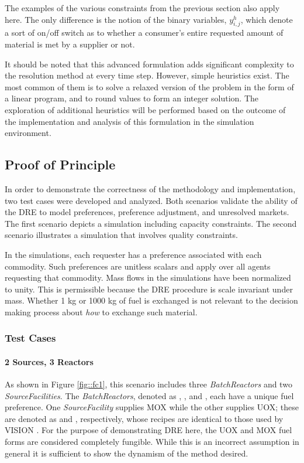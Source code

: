 The examples of the various constraints from the previous section also apply
here. The only difference is the notion of the binary variables, $y_{i,j}^{h}$,
which denote a sort of on/off switch as to whether a consumer's entire requested
amount of material is met by a supplier or not.

It should be noted that this advanced formulation adds significant complexity to
the resolution method at every time step. However, simple heuristics exist. The
most common of them is to solve a relaxed version of the problem in the form of
a linear program, and to round values to form an integer solution. The
exploration of additional heuristics will be performed based on the outcome of
the implementation and analysis of this formulation in the \Cyclus simulation
environment.

\subsection{Proof of Principle}\label{abm:dre:proof}

In order to demonstrate the correctness of the methodology and implementation,
two test cases were developed and analyzed. Both scenarios validate the ability
of the DRE to model preferences, preference adjustment, and unresolved
markets. The first scenario depicts a simulation including capacity
constraints. The second scenario illustrates a simulation that involves quality
constraints.

In the simulations, each requester has a preference associated with each
commodity. Such preferences are unitless scalars and apply over all agents
requesting that commodity. Mass flows in the simulations have been normalized to
unity. This is permissible because the DRE procedure is scale invariant under
mass. Whether 1 kg or 1000 kg of fuel is exchanged is not relevant to the
decision making process about \emph{how} to exchange such material.

\subsubsection{Test Cases}

\paragraph{2 Sources, 3 Reactors}

As shown in Figure \ref{fig::fc1}, this scenario includes
three \textit{BatchReactors} and
two \textit{SourceFacilities}. The \textit{BatchReactors}, denoted
as , , and , each have a unique fuel
preference. One \textit{SourceFacility} supplies MOX while the other supplies
UOX; these are denoted as \MOXSource{} and \UOXSource{}, respectively, whose
recipes are identical to those used by
VISION \cite{jacobson_verifiable_2010}. For the purpose of demonstrating DRE
here, the UOX and MOX fuel forms are considered completely fungible. While this
is an incorrect assumption in general it is sufficient to show the dynamism of
the method desired.

